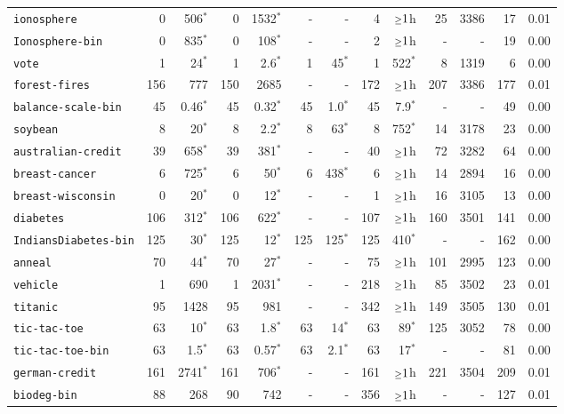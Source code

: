 \begin{tabular}{lrrrrrrrrrrrr}
\texttt{ionosphere} & 0 & 506$^*$ & 0 & 1532$^*$ & - & - & 4 & $\mathsmaller{\geq}1$h & 25 & 3386 & 17 & 0.01\\
\texttt{Ionosphere-bin} & 0 & 835$^*$ & 0 & 108$^*$ & - & - & 2 & $\mathsmaller{\geq}1$h & - & - & 19 & 0.00\\
\texttt{vote} & 1 & 24$^*$ & 1 & 2.6$^*$ & 1 & 45$^*$ & 1 & 522$^*$ & 8 & 1319 & 6 & 0.00\\
\texttt{forest-fires} & 156 & 777 & 150 & 2685 & - & - & 172 & $\mathsmaller{\geq}1$h & 207 & 3386 & 177 & 0.01\\
\texttt{balance-scale-bin} & 45 & 0.46$^*$ & 45 & 0.32$^*$ & 45 & 1.0$^*$ & 45 & 7.9$^*$ & - & - & 49 & 0.00\\
\texttt{soybean} & 8 & 20$^*$ & 8 & 2.2$^*$ & 8 & 63$^*$ & 8 & 752$^*$ & 14 & 3178 & 23 & 0.00\\
\texttt{australian-credit} & 39 & 658$^*$ & 39 & 381$^*$ & - & - & 40 & $\mathsmaller{\geq}1$h & 72 & 3282 & 64 & 0.00\\
\texttt{breast-cancer} & 6 & 725$^*$ & 6 & 50$^*$ & 6 & 438$^*$ & 6 & $\mathsmaller{\geq}1$h & 14 & 2894 & 16 & 0.00\\
\texttt{breast-wisconsin} & 0 & 20$^*$ & 0 & 12$^*$ & - & - & 1 & $\mathsmaller{\geq}1$h & 16 & 3105 & 13 & 0.00\\
\texttt{diabetes} & 106 & 312$^*$ & 106 & 622$^*$ & - & - & 107 & $\mathsmaller{\geq}1$h & 160 & 3501 & 141 & 0.00\\
\texttt{IndiansDiabetes-bin} & 125 & 30$^*$ & 125 & 12$^*$ & 125 & 125$^*$ & 125 & 410$^*$ & - & - & 162 & 0.00\\
\texttt{anneal} & 70 & 44$^*$ & 70 & 27$^*$ & - & - & 75 & $\mathsmaller{\geq}1$h & 101 & 2995 & 123 & 0.00\\
\texttt{vehicle} & 1 & 690 & 1 & 2031$^*$ & - & - & 218 & $\mathsmaller{\geq}1$h & 85 & 3502 & 23 & 0.01\\
\texttt{titanic} & 95 & 1428 & 95 & 981 & - & - & 342 & $\mathsmaller{\geq}1$h & 149 & 3505 & 130 & 0.01\\
\texttt{tic-tac-toe} & 63 & 10$^*$ & 63 & 1.8$^*$ & 63 & 14$^*$ & 63 & 89$^*$ & 125 & 3052 & 78 & 0.00\\
\texttt{tic-tac-toe-bin} & 63 & 1.5$^*$ & 63 & 0.57$^*$ & 63 & 2.1$^*$ & 63 & 17$^*$ & - & - & 81 & 0.00\\
\texttt{german-credit} & 161 & 2741$^*$ & 161 & 706$^*$ & - & - & 161 & $\mathsmaller{\geq}1$h & 221 & 3504 & 209 & 0.01\\
\texttt{biodeg-bin} & 88 & 268 & 90 & 742 & - & - & 356 & $\mathsmaller{\geq}1$h & - & - & 127 & 0.01\\

\end{tabular}
